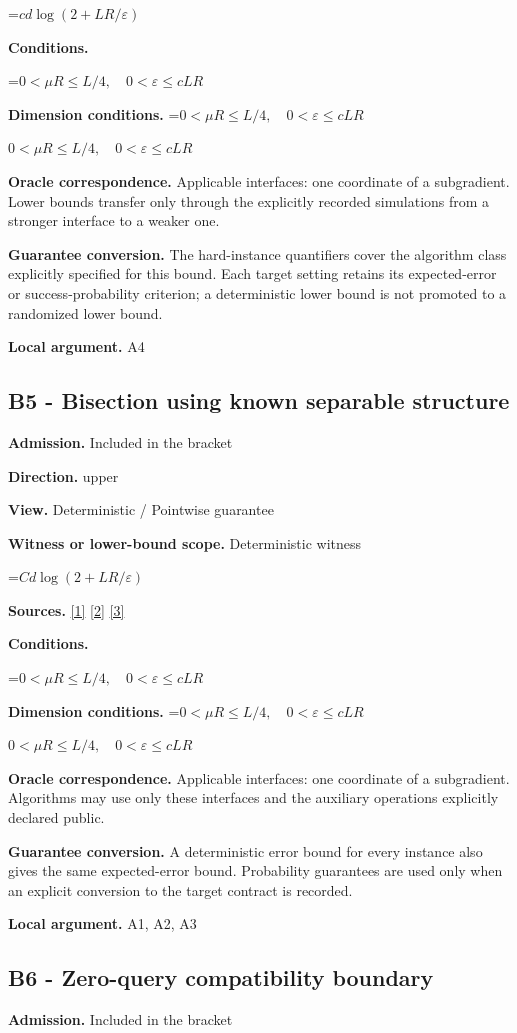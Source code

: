 \documentclass[10pt,a4paper]{article}
\newcommand{\AtlasMath}[1]{\par\begingroup\centering\setbox0=\hbox{$\displaystyle #1$}\ifdim\wd0>1.4\linewidth\typeout{ATLAS WIDE FORMULA: \the\wd0}\fi\ifdim\wd0>\linewidth\resizebox{\linewidth}{!}{\box0}\else\box0\fi\par\endgroup}
\newcommand{\AtlasInlineMath}[1]{\begingroup\setbox0=\hbox{$#1$}\ifdim\wd0>.4\linewidth\endgroup\AtlasMath{#1}\else\endgroup$#1$\fi}
\begin{document}
\AtlasMath{cd\log(2+LR/\varepsilon)}
\textbf{Conditions.} 
\AtlasMath{0<\mu R\le L/4,\quad0<\varepsilon\le cLR}


\textbf{Dimension conditions.} \AtlasInlineMath{0<\mu R\le L/4,\quad0<\varepsilon\le cLR}

\textbf{Oracle correspondence.} Applicable interfaces: one coordinate of a subgradient. Lower bounds transfer only through the explicitly recorded simulations from a stronger interface to a weaker one.

\textbf{Guarantee conversion.} The hard-instance quantifiers cover the algorithm class explicitly specified for this bound. Each target setting retains its expected-error or success-probability criterion; a deterministic lower bound is not promoted to a randomized lower bound.

\textbf{Local argument.} A4

\subsection{B5 - Bisection using known separable structure}
\textbf{Admission.} Included in the bracket

\textbf{Direction.} upper

\textbf{View.} Deterministic / Pointwise guarantee

\textbf{Witness or lower-bound scope.} Deterministic witness

\AtlasMath{Cd\log(2+LR/\varepsilon)}
\textbf{Sources.} \href{https://arxiv.org/pdf/1405.4980}{[1]} \href{https://www2.isye.gatech.edu/~nemirovs/MOR_AccuracyCertificates.pdf}{[2]} \href{https://arxiv.org/pdf/2609.20701}{[3]}

\textbf{Conditions.} 
\AtlasMath{0<\mu R\le L/4,\quad0<\varepsilon\le cLR}


\textbf{Dimension conditions.} \AtlasInlineMath{0<\mu R\le L/4,\quad0<\varepsilon\le cLR}

\textbf{Oracle correspondence.} Applicable interfaces: one coordinate of a subgradient. Algorithms may use only these interfaces and the auxiliary operations explicitly declared public.

\textbf{Guarantee conversion.} A deterministic error bound for every instance also gives the same expected-error bound. Probability guarantees are used only when an explicit conversion to the target contract is recorded.

\textbf{Local argument.} A1, A2, A3

\subsection{B6 - Zero-query compatibility boundary}
\textbf{Admission.} Included in the bracket
\end{document}

